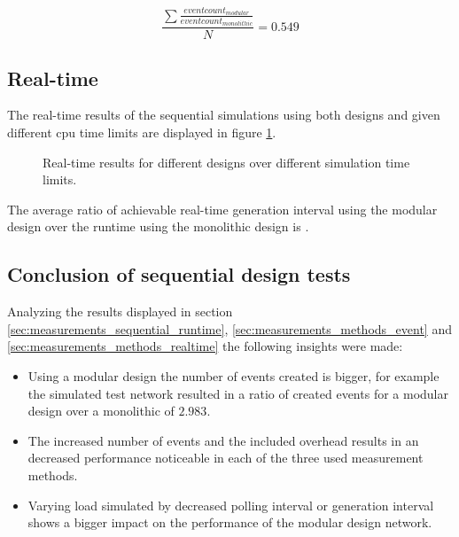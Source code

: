 \[\frac{\sum\frac{eventcount_{modular}}{eventcount_{monolithic}}}{N} = 0.549\]

\subsection{Real-time}
\label{sec:measurements_sequential_realtime}

The real-time results of the sequential simulations using both designs and given different cpu time limits are displayed in figure \ref{fig:results_realtime_sim_time}.

\begin{figure}
    \centering
    \caption{Real-time results for different designs over different simulation time limits.}
    \label{fig:results_realtime_sim_time}
\end{figure}

The average ratio of achievable real-time generation interval using the modular design over the runtime using the monolithic design is . %

\subsection{Conclusion of sequential design tests}
\label{sec:measurements_sequential_conclusion}

Analyzing the results displayed in section \ref{sec:measurements_sequential_runtime}, \ref{sec:measurements_methods_event} and \ref{sec:measurements_methods_realtime} the following insights were made:

\begin{itemize}
    \item Using a modular design the number of events created is bigger, for example the simulated test network resulted in a ratio of created events for a modular design over a monolithic of $2.983$.
    \item The increased number of events and the included overhead results in an decreased performance noticeable in each of the three used measurement methods.
    \item Varying load simulated by decreased polling interval or generation interval shows a bigger impact on the performance of the modular design network.
\end{itemize}

